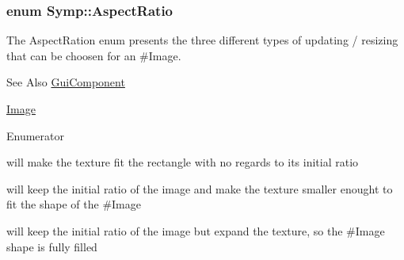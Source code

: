 \hypertarget{namespace_symp_a2d0f7a8e888710a800fc73cf4d1ed38d}{
\subsubsection[{Aspect\-Ratio}]{\setlength{\rightskip}{0pt plus 5cm}enum {\bf Symp\-::\-Aspect\-Ratio}}}\label{namespace_symp_a2d0f7a8e888710a800fc73cf4d1ed38d}
The Aspect\-Ration enum presents the three different types of updating / resizing that can be choosen for an \#\-Image. \begin{DoxySeeAlso}{See Also}
\hyperlink{class_symp_1_1_gui_component}{Gui\-Component} 

\hyperlink{class_symp_1_1_image}{Image} 
\end{DoxySeeAlso}
\begin{Desc}
\item[Enumerator]\par
\begin{description}
\item[{\em 
\hypertarget{namespace_symp_a2d0f7a8e888710a800fc73cf4d1ed38da37080ec8b73f25dde405c571395ac4a5}{I\-G\-N\-O\-R\-E\-\_\-\-A\-S\-P\-E\-C\-T\-\_\-\-R\-A\-T\-I\-O}\label{namespace_symp_a2d0f7a8e888710a800fc73cf4d1ed38da37080ec8b73f25dde405c571395ac4a5}
}]will make the texture fit the rectangle with no regards to its initial ratio \item[{\em 
\hypertarget{namespace_symp_a2d0f7a8e888710a800fc73cf4d1ed38dac4b5023ead73709a534ee793228f8c1f}{K\-E\-E\-P\-\_\-\-A\-S\-P\-E\-C\-T\-\_\-\-R\-A\-T\-I\-O}\label{namespace_symp_a2d0f7a8e888710a800fc73cf4d1ed38dac4b5023ead73709a534ee793228f8c1f}
}]will keep the initial ratio of the image and make the texture smaller enought to fit the shape of the \#\-Image \item[{\em 
\hypertarget{namespace_symp_a2d0f7a8e888710a800fc73cf4d1ed38da27f6dac15bcc6e5e18a0044f7a73dd1e}{E\-X\-P\-A\-N\-D\-\_\-\-A\-S\-P\-E\-C\-T\-\_\-\-R\-A\-T\-I\-O}\label{namespace_symp_a2d0f7a8e888710a800fc73cf4d1ed38da27f6dac15bcc6e5e18a0044f7a73dd1e}
}]will keep the initial ratio of the image but expand the texture, so the \#\-Image shape is fully filled \end{description}
\end{Desc}


